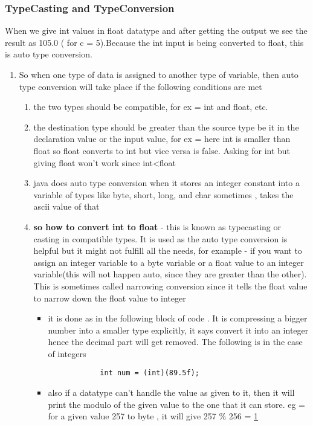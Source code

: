 \documentclass[11pt]{article}
\begin{document}
\subsubsection{TypeCasting and TypeConversion}
\label{sec:org302bb94}
When we give int values in float datatype and after getting the output we see the result as 105.0 ( for c = 5).Because the int input is being converted to float, this is auto type conversion.
\begin{enumerate}
\item So when one type of data is assigned to another type of variable, then auto type conversion will take place if the following conditions are met
\begin{enumerate}
\item the two types should be compatible, for ex = int and float, etc.
\item the destination type should be greater than the source type be it in the declaration value or the input value, for ex = here int is smaller than float so float converts to int but vice versa is false. Asking for int but giving float won't work since int<float
\item java does auto type conversion when it stores an integer constant into a variable of types like byte, short, long, and char sometimes , takes the ascii value of that
\item \textbf{so how to convert int to float} - this is known as typecasting or casting in compatible types. It is used as the auto type conversion is helpful but it might not fulfill all the needs, for example - if you want to assign an integer variable to a byte variable or a float value to an integer variable(this will not happen auto, since they are greater than the other). This is sometimes called narrowing conversion since it tells the float value to narrow down the float value to integer
\begin{itemize}
\item it is done as in the following block of code . It is compressing a bigger number into a smaller type explicitly, it says convert it into an integer hence the decimal part will get removed. The following is in the case of integers
\begin{verbatim}
            int num = (int)(89.5f);
\end{verbatim}
\item also if a datatype can't handle the value as given to it, then it will print the modulo of the given value to the one that it can store. eg = for a given value 257 to byte , it will give 257 \% 256 = \uline{1}

\end{itemize}
\end{enumerate}
\end{enumerate}
\end{document}
